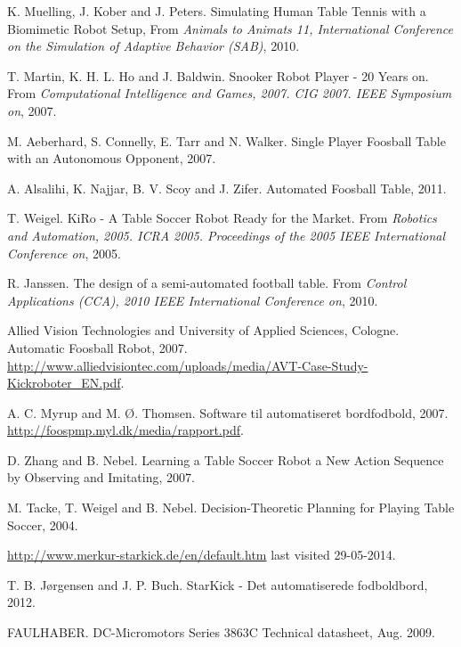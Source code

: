 \begin{thebibliography}{1}

 K. Muelling, J. Kober and J. Peters. Simulating Human Table Tennis with a Biomimetic Robot Setup, From \emph{Animals to Animats 11, International Conference on the Simulation of Adaptive Behavior (SAB)}, 2010.

 T. Martin, K. H. L. Ho and J. Baldwin. Snooker Robot Player - 20 Years
on. From \emph{Computational Intelligence and Games, 2007. CIG 2007. IEEE Symposium on}, 2007.

 M. Aeberhard, S. Connelly, E. Tarr and N. Walker. Single Player Foosball Table with an Autonomous Opponent, 2007.

 A. Alsalihi, K. Najjar, B. V. Scoy and J. Zifer. Automated Foosball Table, 2011.

 T. Weigel. KiRo - A Table Soccer Robot Ready for the Market. From \emph{Robotics and Automation, 2005. ICRA 2005. Proceedings of the 2005 IEEE International Conference on}, 2005.

 R. Janssen. The design of a semi-automated football table. From \emph{Control Applications (CCA), 2010 IEEE International Conference on}, 2010.

 Allied Vision Technologies and University of Applied Sciences, Cologne. Automatic Foosball Robot, 2007. \url{http://www.alliedvisiontec.com/uploads/media/AVT-Case-Study-Kickroboter_EN.pdf}.


 A. C. Myrup and M. Ø. Thomsen. Software til automatiseret bordfodbold, 2007. \url{http://foospmp.myl.dk/media/rapport.pdf}.

 D. Zhang and B. Nebel. Learning a Table Soccer Robot a New Action Sequence
by Observing and Imitating, 2007.

 M. Tacke, T. Weigel and B. Nebel. Decision-Theoretic Planning for Playing
Table Soccer, 2004.

 \url{http://www.merkur-starkick.de/en/default.htm} last visited 29-05-2014.

  T. B. Jørgensen and J. P. Buch. StarKick - Det automatiserede fodboldbord, 2012.

 FAULHABER. DC-Micromotors Series 3863C Technical datasheet, Aug. 2009.


\end{thebibliography}
